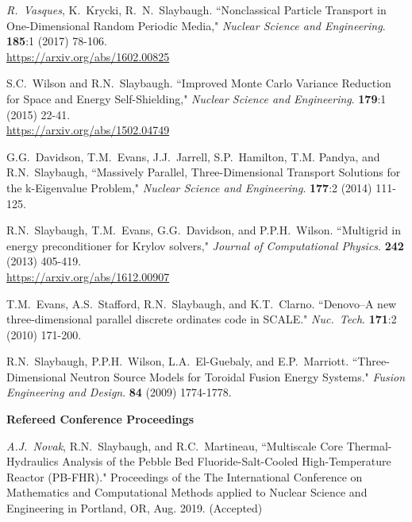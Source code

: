\begin{bibsection}
\item \textit{R.\ Vasques}, K.\ Krycki, R.\ N.\ Slaybaugh. ``Nonclassical Particle Transport in One-Dimensional Random Periodic Media," \textit{Nuclear Science and Engineering}.  \textbf{185}:1 (2017) 78-106.\\
\url{https://arxiv.org/abs/1602.00825}

\item S.C.\ Wilson and R.N.\ Slaybaugh. ``Improved Monte Carlo Variance Reduction for Space and Energy Self-Shielding," \textit{Nuclear Science and Engineering}. \textbf{179}:1 (2015) 22-41.\\
\url{https://arxiv.org/abs/1502.04749}

\item G.G.\ Davidson, T.M.\ Evans, J.J.\ Jarrell, S.P.\ Hamilton, T.M. Pandya, and R.N.\ Slaybaugh, ``Massively Parallel, Three-Dimensional Transport Solutions for the k-Eigenvalue Problem," \textit{Nuclear Science and Engineering}. \textbf{177}:2 (2014) 111-125.

\item R.N.\ Slaybaugh, T.M.\ Evans, G.G.\ Davidson, and P.P.H.\ Wilson. ``Multigrid in energy preconditioner for Krylov solvers," \textit{Journal of Computational Physics}. \textbf{242} (2013) 405-419.\\
\url{https://arxiv.org/abs/1612.00907}

\item T.M.\ Evans, A.S.\ Stafford, R.N.\ Slaybaugh, and K.T.\ Clarno. ``Denovo--A new three-dimensional parallel discrete ordinates code in SCALE." \textit{Nuc.\ Tech}. \textbf{171}:2 (2010) 171-200.

\item R.N.\ Slaybaugh, P.P.H.\ Wilson, L.A.\ El-Guebaly, and E.P.\ Marriott. ``Three-Dimensional Neutron Source Models for Toroidal Fusion Energy Systems." \textit{Fusion Engineering and Design}. \textbf{84} (2009) 1774-1778. 

\item \textbf{Refereed Conference Proceedings}
\item \textit{A.J.\ Novak}, R.N.\ Slaybaugh, and R.C.\ Martineau, ``Multiscale Core Thermal-Hydraulics Analysis of the Pebble Bed Fluoride-Salt-Cooled High-Temperature Reactor (PB-FHR)." Proceedings of the The International Conference on Mathematics and Computational Methods applied to Nuclear Science and Engineering in Portland, OR, Aug. 2019. (Accepted) 


\end{bibsection}
